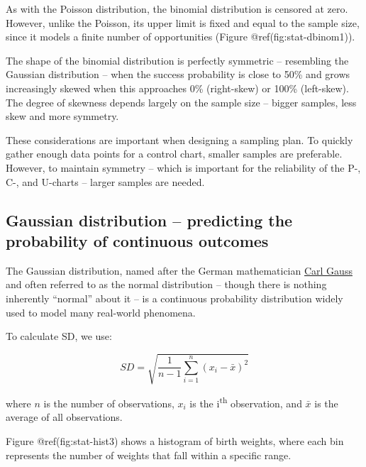 \documentclass[
]{book}
\newenvironment{Shaded}{\begin{snugshade}}{\end{snugshade}}
\newcommand{\AttributeTok}[1]{\textcolor[rgb]{0.13,0.29,0.53}{#1}}
\newcommand{\DecValTok}[1]{\textcolor[rgb]{0.00,0.00,0.81}{#1}}
\newcommand{\FunctionTok}[1]{\textcolor[rgb]{0.13,0.29,0.53}{\textbf{#1}}}
\newcommand{\NormalTok}[1]{#1}
\newcommand{\SpecialCharTok}[1]{\textcolor[rgb]{0.81,0.36,0.00}{\textbf{#1}}}
\begin{document}
As with the Poisson distribution, the binomial distribution is censored
at zero. However, unlike the Poisson, its upper limit is fixed and equal
to the sample size, since it models a finite number of opportunities
(Figure @ref(fig:stat-dbinom1)).

The shape of the binomial distribution is perfectly symmetric --
resembling the Gaussian distribution -- when the success probability is
close to 50\% and grows increasingly skewed when this approaches 0\%
(right-skew) or 100\% (left-skew). The degree of skewness depends
largely on the sample size -- bigger samples, less skew and more
symmetry.

These considerations are important when designing a sampling plan. To
quickly gather enough data points for a control chart, smaller samples
are preferable. However, to maintain symmetry -- which is important for
the reliability of the P-, C-, and U-charts -- larger samples are
needed.

\subsection{Gaussian distribution -- predicting the probability of
continuous
outcomes}\label{gaussian-distribution-predicting-the-probability-of-continuous-outcomes}

The Gaussian distribution, named after the German mathematician
\href{https://en.wikipedia.org/wiki/Carl_Friedrich_Gauss}{Carl Gauss}
and often referred to as the normal distribution -- though there is
nothing inherently ``normal'' about it -- is a continuous probability
distribution widely used to model many real-world phenomena.

To calculate SD, we use:

\[
SD = \sqrt{\frac{1}{n - 1} \sum_{i=1}^{n} (x_i - \bar{x})^2}
\]

where \(n\) is the number of observations, \(x_i\) is the
i\textsuperscript{th} observation, and \(\bar{x}\) is the average of all
observations.

Figure @ref(fig:stat-hist3) shows a histogram of birth weights, where
each bin represents the number of weights that fall within a specific
range.

\begin{Shaded}
\end{Shaded}
\end{document}
